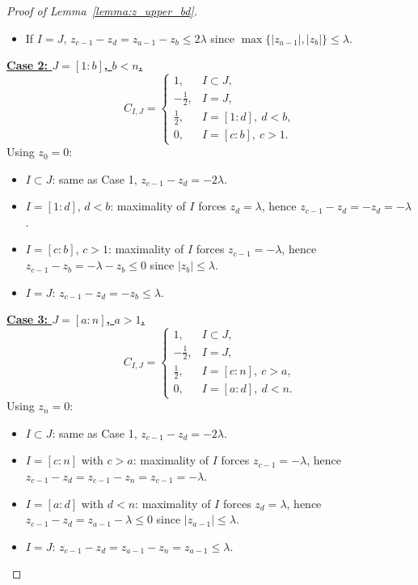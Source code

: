 \documentclass[11pt]{article}
\theoremstyle{plain}
\theoremstyle{definition}
\theoremstyle{remark}
\begin{document}
\begin{appendix}
\begin{proof}[Proof of Lemma~\ref{lemma:z_upper_bd}]
\begin{itemize}
\item If $I=J$, $z_{c-1}-z_d = z_{a-1}-z_b \leq 2\lambda$ since $\max\{|z_{a - 1}|,|z_{b}|\} \leq \lambda.$
\end{itemize}

\medskip
\noindent\underline{\textbf{Case 2: $J=[1:b]$, $b<n$.}}
\[
C_{I,J}=
\begin{cases}
1, & I\subset J,\\
-\tfrac12, & I=J,\\
\tfrac12, & I=[1:d],\ d<b,\\
0, & I=[c:b],\ c>1.
\end{cases}
\]
Using $z_0=0$:
\begin{itemize}
\item $I\subset J$: same as Case 1, $z_{c-1}-z_d=-2\lambda$.
\item $I=[1:d]$, $d<b$: maximality of $I$ forces $z_d=\lambda$, hence $z_{c-1}-z_d=-z_d=-\lambda$.
\item $I=[c:b]$, $c>1$: maximality of $I$ forces $z_{c-1}=-\lambda$, hence $z_{c-1}-z_b=-\lambda-z_b \le 0$ since $|z_b|\le \lambda$.
\item $I=J$: $z_{c-1}-z_d=-z_b\le\lambda$.
\end{itemize}

\medskip
\noindent\underline{\textbf{Case 3: $J=[a:n]$, $a>1$.}}
\[
C_{I,J}=
\begin{cases}
1, & I\subset J,\\
-\tfrac12, & I=J,\\
\tfrac12, & I=[c:n],\ c>a,\\
0, & I=[a:d],\ d<n.
\end{cases}
\]
Using $z_n=0$:
\begin{itemize}
\item $I\subset J$: same as Case 1, $z_{c-1}-z_d=-2\lambda$.
\item $I=[c:n]$ with $c>a$: maximality of $I$ forces $z_{c-1}=-\lambda$, hence $z_{c-1}-z_d=z_{c-1}-z_n=z_{c-1}=-\lambda$.
\item $I=[a:d]$ with $d<n$: maximality of $I$ forces $z_d=\lambda$, hence $z_{c-1}-z_d=z_{a-1}-\lambda\le 0$ since $|z_{a-1}|\le\lambda$.
\item $I=J$: $z_{c-1}-z_d=z_{a-1}-z_n=z_{a-1}\le \lambda$.
\end{itemize}


\end{proof}
\end{appendix}
\end{document}
